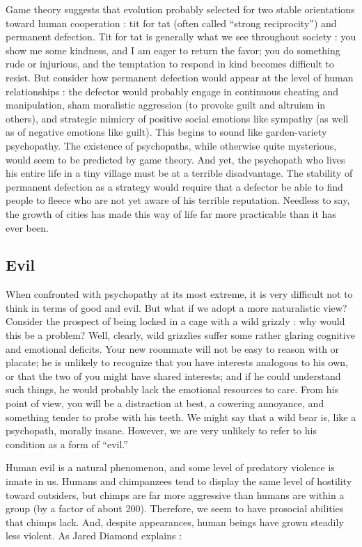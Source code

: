 \documentclass[a4paper,14pt]{extarticle}
\begin{document}
Game theory suggests that evolution probably selected for two stable orientations toward human cooperation :
tit for tat (often called ``strong reciprocity'') and permanent defection.
Tit for tat is generally what we see throughout society :
you show me some kindness, and I am eager to return the favor;
you do something rude or injurious, and the temptation to respond in kind becomes difficult to resist.
But consider how permanent defection would appear at the level of human relationships :
the defector would probably engage in continuous cheating and manipulation, sham moralistic aggression (to provoke guilt and altruism in others), and strategic mimicry of positive social emotions like sympathy (as well as of negative emotions like guilt).
This begins to sound like garden-variety psychopathy.
The existence of psychopaths, while otherwise quite mysterious, would seem to be predicted by game theory.
And yet, the psychopath who lives his entire life in a tiny village must be at a terrible disadvantage.
The stability of permanent defection as a strategy would require that a defector be able to find people to fleece who are not yet aware of his terrible reputation.
Needless to say, the growth of cities has made this way of life far more practicable than it has ever been.

\subsection{Evil}

When confronted with psychopathy at its most extreme, it is very difficult not to think in terms of good and evil.
But what if we adopt a more naturalistic view?
Consider the prospect of being locked in a cage with a wild grizzly :
why would this be a problem?
Well, clearly, wild grizzlies suffer some rather glaring cognitive and emotional deficits.
Your new roommate will not be easy to reason with or placate;
he is unlikely to recognize that you have interests analogous to his own, or that the two of you might have shared interests;
and if he could understand such things, he would probably lack the emotional resources to care.
From his point of view, you will be a distraction at best, a cowering annoyance, and something tender to probe with his teeth.
We might say that a wild bear is, like a psychopath, morally insane.
However, we are very unlikely to refer to his condition as a form of ``evil.''

Human evil is a natural phenomenon, and some level of predatory violence is innate in us.
Humans and chimpanzees tend to display the same level of hostility toward outsiders, but chimps are far more aggressive than humans are within a group (by a factor of about 200).
Therefore, we seem to have prosocial abilities that chimps lack.
And, despite appearances, human beings have grown steadily less violent.
As Jared Diamond explains :
\end{document}
